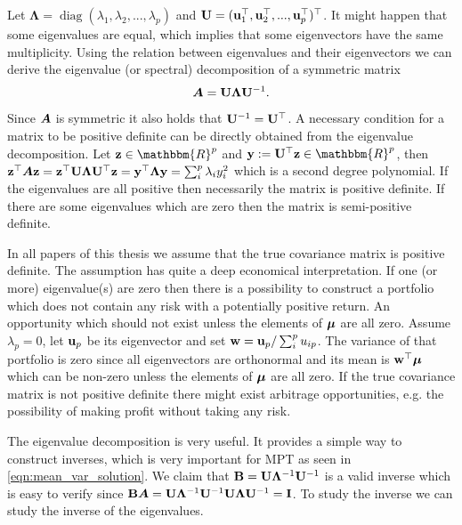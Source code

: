 \documentclass[]{book}\usepackage{knitr}
\begin{document}
Let $\boldsymbol{\Lambda} = \operatorname{diag}(\lambda_1, \lambda_2,...,\lambda_p)$ and $\mathbf{U}= (\mathbf{u}_1^\top, \mathbf{u}_2^\top, ..., \mathbf{u}_p^\top)^\top$. It might happen that some eigenvalues are equal, which implies that some eigenvectors have the same multiplicity.
Using the relation between eigenvalues and their eigenvectors we can derive the eigenvalue (or spectral) decomposition of a symmetric matrix 
\begin{equation}\label{eqn:eigenvalue_decomp}
	\mbox{\boldmath$A$} = \mathbf{U} \boldsymbol{\Lambda} \mathbf{U}^{-1}.
\end{equation}
Since $\mbox{\boldmath$A$}$ is symmetric it also holds that $\mathbf{U}^{-1} = \mathbf{U}^\top$.
A necessary condition for a matrix to be positive definite can be directly obtained from the eigenvalue decomposition. 
Let $\bz\in \mathbbm{R}^p$ and $\by := \bU^{\top} \bz \in \mathbbm{R}^p$, then $\mathbf{z}^\top \mbox{\boldmath$A$} \mathbf{z} = \mathbf{z}^\top \mathbf{U} \boldsymbol{\Lambda} \mathbf{U} ^{\top} \mathbf{z} = \mathbf{y}^\top \boldsymbol{\Lambda} \mathbf{y} = \sum_i^p \lambda_i y_i^2$ which is a second degree polynomial. 
If the eigenvalues are all positive then necessarily the matrix is positive definite. 
If there are some eigenvalues which are zero then the matrix is semi-positive definite. 

In all papers of this thesis we assume that the true covariance matrix is positive definite. 
The assumption has quite a deep economical interpretation.
If one (or more) eigenvalue(s) are zero then there is a possibility to construct a portfolio which does not contain any risk with a potentially positive return. 
An opportunity which should not exist unless the elements of $\mbox{\boldmath$\mu$}$ are all zero.
Assume $\lambda_p=0$, let $\mathbf{u}_p$ be its eigenvector and set $\mathbf{w} = \mathbf{u}_p / \sum_i^p u_{ip}$. 
The variance of that portfolio is zero since all eigenvectors are orthonormal and its mean is $\mathbf{w}^\top \mbox{\boldmath$\mu$}$ which can be non-zero unless the elements of $\mbox{\boldmath$\mu$}$ are all zero.
If the true covariance matrix is not positive definite there might exist arbitrage opportunities, e.g. the possibility of making profit without taking any risk.

The eigenvalue decomposition is very useful.
It provides a simple way to construct inverses, which is very important for MPT as seen in \eqref{eqn:mean_var_solution}.
We claim that $\mathbf{B} = \mathbf{U} \boldsymbol{\Lambda}^{-1} \mathbf{U}^{-1}$ is a valid inverse which is easy to verify since $\mathbf{B} \mbox{\boldmath$A$} = \mathbf{U} \boldsymbol{\Lambda}^{-1} \mathbf{U}^{-1} \mathbf{U} \boldsymbol{\Lambda} \mathbf{U}^{-1} = \mathbf{I}$. 
To study the inverse we can study the inverse of the eigenvalues.
\end{document}
